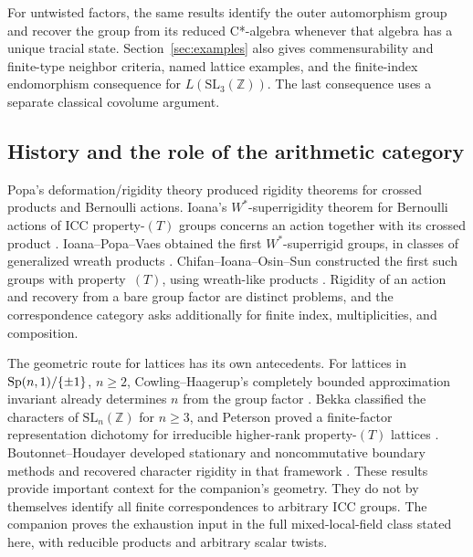 For untwisted factors, the same results identify the outer automorphism
group and recover the group from its reduced C*-algebra whenever that
algebra has a unique tracial state. Section~\ref{sec:examples} also gives
commensurability and finite-type neighbor criteria, named lattice examples,
and the finite-index endomorphism consequence for $L(\mathrm{SL}_3(\mathbb Z))$.
The last consequence uses a separate classical covolume argument.

\subsection{History and the role of the arithmetic category}

Popa's deformation/rigidity theory produced rigidity theorems for crossed
products and Bernoulli actions. Ioana's $W^*$-superrigidity theorem for
Bernoulli actions of ICC property-$(T)$ groups concerns an action together
with its crossed product \cite{Ioana2011}. Ioana--Popa--Vaes obtained the
first $W^*$-superrigid groups, in classes of generalized wreath products
\cite{IPV2013}. Chifan--Ioana--Osin--Sun constructed the first such groups
with property~$(T)$, using wreath-like products \cite{CIOS2023}.
Rigidity of an action and recovery from a bare group factor are distinct
problems, and the correspondence category asks additionally for finite
index, multiplicities, and composition.

The geometric route for lattices has its own antecedents. For lattices in
$\operatorname{Sp}(n,1)/\{\pm1\}$, $n\geq2$, Cowling--Haagerup's completely bounded
approximation invariant already determines $n$ from the group factor
\cite[Main theorem and Propositions~6.1--6.2]{CowlingHaagerup1989}.
Bekka classified
the characters of $\mathrm{SL}_n(\mathbb Z)$ for $n\geq3$, and Peterson
proved a finite-factor representation dichotomy for irreducible
higher-rank property-$(T)$ lattices \cite{Bekka2007,Peterson2014}.
Boutonnet--Houdayer developed stationary and noncommutative boundary
methods and recovered character rigidity in that framework
\cite{BoutonnetHoudayer2021}. These results provide important context
for the companion's geometry. They do not by themselves identify all
finite correspondences to arbitrary ICC groups. The companion proves the
exhaustion input in the full mixed-local-field class stated here, with
reducible products and arbitrary scalar twists.

